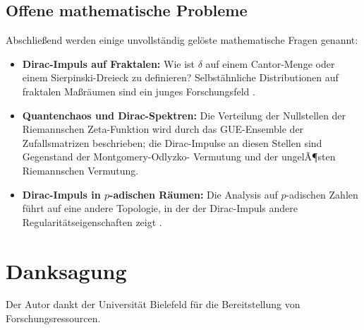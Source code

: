 ﻿\documentclass[a4paper,12pt]{article}
\theoremstyle{definition}
\begin{document}
\subsection{Offene mathematische Probleme}

Abschlie{\ss}end werden einige unvollst\"andig gel\"oste mathematische Fragen genannt:

\begin{itemize}
    \item \textbf{Dirac-Impuls auf Fraktalen:} Wie ist $\delta$ auf einem Cantor-Menge
          oder einem Sierpinski-Dreieck zu definieren? Selbst\"ahnliche Distributionen
          auf fraktalen Ma{\ss}r\"aumen sind ein junges Forschungsfeld \cite{strichartz1999}.
    \item \textbf{Quantenchaos und Dirac-Spektren:} Die Verteilung der Nullstellen der
          Riemannschen Zeta-Funktion wird durch das GUE-Ensemble der Zufallsmatrizen
          beschrieben; die Dirac-Impulse an diesen Stellen sind Gegenstand der Montgomery-Odlyzko-
          Vermutung und der ungelÃ¶sten Riemannschen Vermutung.
    \item \textbf{Dirac-Impuls in $p$-adischen R\"aumen:} Die Analysis auf $p$-adischen
          Zahlen f\"uhrt auf eine andere Topologie, in der der Dirac-Impuls andere
          Regularit\"atseigenschaften zeigt \cite{vvz1994}.
\end{itemize}

\section*{Danksagung}

Der Autor dankt der Universit\"at Bielefeld f\"ur die Bereitstellung von Forschungsressourcen.
\end{document}
